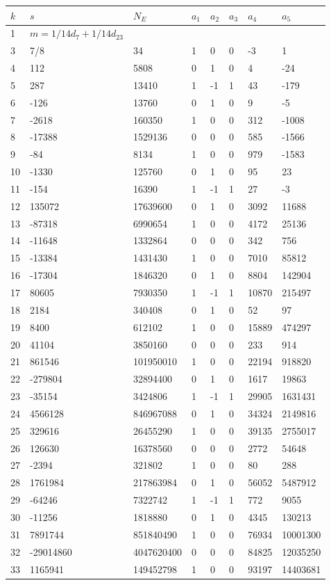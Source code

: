 \documentclass{amsart}
\begin{document}
\begin{longtable}{|l|l|l|lllll|}
\hline
$k$ & $s$ & $N_E$ & $a_1$ & $a_2$ & $a_3$ & $a_4$ & $a_5$\\
\hline
1&$m=1/14d_{7}+1/14d_{23}$&&\multicolumn{5}{c|}{}\\
3&7/8&34&1&0&0&-3&1\\
4&112&5808&0&1&0&4&-24\\
5&287&13410&1&-1&1&43&-179\\
6&-126&13760&0&1&0&9&-5\\
7&-2618&160350&1&0&0&312&-1008\\
8&-17388&1529136&0&0&0&585&-1566\\
9&-84&8134&1&0&0&979&-1583\\
10&-1330&125760&0&1&0&95&23\\
11&-154&16390&1&-1&1&27&-3\\
12&135072&17639600&0&1&0&3092&11688\\
13&-87318&6990654&1&0&0&4172&25136\\
14&-11648&1332864&0&0&0&342&756\\
15&-13384&1431430&1&0&0&7010&85812\\
16&-17304&1846320&0&1&0&8804&142904\\
17&80605&7930350&1&-1&1&10870&215497\\
18&2184&340408&0&1&0&52&97\\
19&8400&612102&1&0&0&15889&474297\\
20&41104&3850160&0&0&0&233&914\\
21&861546&101950010&1&0&0&22194&918820\\
22&-279804&32894400&0&1&0&1617&19863\\
23&-35154&3424806&1&-1&1&29905&1631431\\
24&4566128&846967088&0&1&0&34324&2149816\\
25&329616&26455290&1&0&0&39135&2755017\\
26&126630&16378560&0&0&0&2772&54648\\
27&-2394&321802&1&0&0&80&288\\
28&1761984&217863984&0&1&0&56052&5487912\\
29&-64246&7322742&1&-1&1&772&9055\\
30&-11256&1818880&0&1&0&4345&130213\\
31&7891744&851840490&1&0&0&76934&10001300\\
32&-29014860&4047620400&0&0&0&84825&12035250\\
33&1165941&149452798&1&0&0&93197&14403681\\

\end{longtable}
\end{document}
